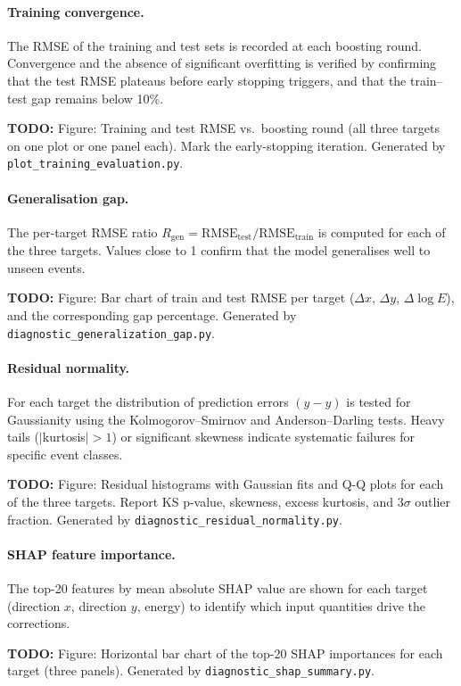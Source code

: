 \documentclass[12pt]{article}
\newcommand{\todo}[1]{\begin{hintBox} \textbf{TODO:} #1 \end{hintBox}}
\begin{document}
\paragraph{Training convergence.}
The RMSE of the training and test sets is recorded at each boosting round.
Convergence and the absence of significant overfitting is verified by
confirming that the test RMSE plateaus before early stopping triggers,
and that the train--test gap remains below 10\%.
\todo{Figure: Training and test RMSE vs.\ boosting round (all three targets on one plot or one panel each). Mark the early-stopping iteration. Generated by \texttt{plot\_training\_evaluation.py}.}

\paragraph{Generalisation gap.}
The per-target RMSE ratio $R_\mathrm{gen} = \mathrm{RMSE}_\mathrm{test} / \mathrm{RMSE}_\mathrm{train}$
is computed for each of the three targets.
Values close to 1 confirm that the model generalises well to unseen events.
\todo{Figure: Bar chart of train and test RMSE per target ($\Delta x$, $\Delta y$, $\Delta\log E$), and the corresponding gap percentage. Generated by \texttt{diagnostic\_generalization\_gap.py}.}

\paragraph{Residual normality.}
For each target the distribution of prediction errors $(y - \hat{y})$ is tested
for Gaussianity using the Kolmogorov--Smirnov and Anderson--Darling tests.
Heavy tails ($|$kurtosis$| > 1$) or significant skewness indicate systematic failures
for specific event classes.
\todo{Figure: Residual histograms with Gaussian fits and Q-Q plots for each of the three targets. Report KS p-value, skewness, excess kurtosis, and 3$\sigma$ outlier fraction. Generated by \texttt{diagnostic\_residual\_normality.py}.}

\paragraph{SHAP feature importance.}
The top-20 features by mean absolute SHAP value are shown for each target
(direction $x$, direction $y$, energy) to identify which input quantities
drive the corrections.
\todo{Figure: Horizontal bar chart of the top-20 SHAP importances for each target (three panels). Generated by \texttt{diagnostic\_shap\_summary.py}.}
\end{document}
